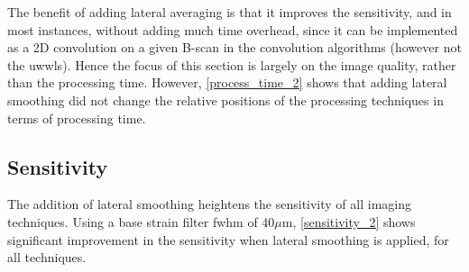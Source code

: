 The benefit of adding lateral averaging is that it improves the sensitivity, and in most instances, without adding much time overhead, since it can be implemented as a 2D convolution on a given B-scan in the convolution algorithms (however not the \ac{uwwls}). Hence the focus of this section is largely on the image quality, rather than the processing time. However, \autoref{process_time_2} shows that adding lateral smoothing did not change the relative positions of the processing techniques in terms of processing time.

\subsection{Sensitivity}

The addition of lateral smoothing heightens the sensitivity of all imaging techniques. Using a base strain filter \ac{fwhm} of 40$\mu$m, \autoref{sensitivity_2} shows significant improvement in the sensitivity when lateral smoothing is applied, for all techniques.

